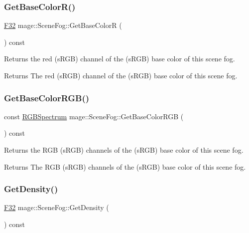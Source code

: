 \subsubsection{\texorpdfstring{Get\+Base\+Color\+R()}{GetBaseColorR()}}
{\footnotesize\ttfamily \hyperlink{namespacemage_aa97e833b45f06d60a0a9c4fc22ae02c0}{F32} mage\+::\+Scene\+Fog\+::\+Get\+Base\+ColorR (\begin{DoxyParamCaption}{ }\end{DoxyParamCaption}) const\hspace{0.3cm}{\ttfamily [noexcept]}}

Returns the red (s\+R\+GB) channel of the (s\+R\+GB) base color of this scene fog.

\begin{DoxyReturn}{Returns}
The red (s\+R\+GB) channel of the (s\+R\+GB) base color of this scene fog. 
\end{DoxyReturn}
\hypertarget{classmage_1_1_scene_fog_a39742581a93d1b654bb257a3b41783ef}{}\label{classmage_1_1_scene_fog_a39742581a93d1b654bb257a3b41783ef} 
\subsubsection{\texorpdfstring{Get\+Base\+Color\+R\+G\+B()}{GetBaseColorRGB()}}
{\footnotesize\ttfamily const \hyperlink{structmage_1_1_r_g_b_spectrum}{R\+G\+B\+Spectrum} mage\+::\+Scene\+Fog\+::\+Get\+Base\+Color\+R\+GB (\begin{DoxyParamCaption}{ }\end{DoxyParamCaption}) const\hspace{0.3cm}{\ttfamily [noexcept]}}

Returns the R\+GB (s\+R\+GB) channels of the (s\+R\+GB) base color of this scene fog.

\begin{DoxyReturn}{Returns}
The R\+GB (s\+R\+GB) channels of the (s\+R\+GB) base color of this scene fog. 
\end{DoxyReturn}
\hypertarget{classmage_1_1_scene_fog_adb3156f178ef56223329e73abb134e1c}{}\label{classmage_1_1_scene_fog_adb3156f178ef56223329e73abb134e1c} 
\subsubsection{\texorpdfstring{Get\+Density()}{GetDensity()}}
{\footnotesize\ttfamily \hyperlink{namespacemage_aa97e833b45f06d60a0a9c4fc22ae02c0}{F32} mage\+::\+Scene\+Fog\+::\+Get\+Density (\begin{DoxyParamCaption}{ }\end{DoxyParamCaption}) const\hspace{0.3cm}{\ttfamily [noexcept]}}

